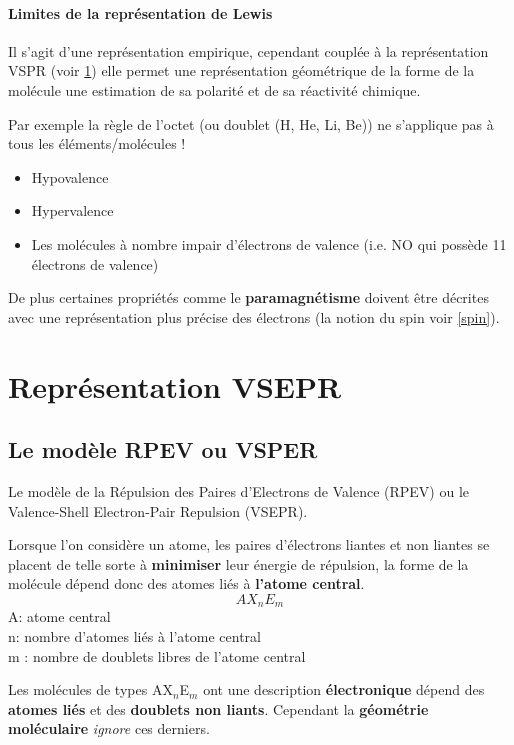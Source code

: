 \documentclass[10pt,a4paper]{book}
\begin{document}
\paragraph{Limites de la représentation de Lewis} Il s'agit d'une représentation empirique, cependant couplée à la représentation VSPR (voir \ref{VSPR}) elle permet une représentation géométrique de la forme de la molécule une estimation de sa polarité et de sa réactivité chimique. \par
Par exemple la règle de l'octet (ou doublet (H, He, Li, Be)) ne s'applique pas à tous les éléments/molécules !
\begin{itemize}
\item Hypovalence
\item Hypervalence
\item Les molécules à nombre impair d'électrons de valence (i.e. NO qui possède 11 électrons de valence)
\end{itemize}
De plus certaines propriétés comme le \textbf{paramagnétisme} doivent être décrites avec une représentation plus précise des électrons (la notion du spin voir \ref{spin}).

\section{Représentation VSEPR} \label{VSPR}

\subsection{Le modèle RPEV ou VSPER}

Le modèle de la Répulsion des Paires d'Electrons de Valence (RPEV) ou le Valence-Shell Electron-Pair Repulsion (VSEPR). \par
Lorsque l'on considère un atome, les paires d'électrons liantes et non liantes se placent de telle sorte à \textbf{minimiser} leur énergie de répulsion, la forme de la molécule dépend donc des atomes liés à \textbf{l'atome central}.
\begin{displaymath}
AX_nE_m
\end{displaymath}
A: atome central \\
n: nombre d'atomes liés à l'atome central \\
m : nombre de doublets libres de l'atome central \\ \par
Les molécules de types AX$_n$E$_m$ ont une description \textbf{électronique} dépend des \textbf{atomes liés} et des \textbf{doublets non liants}. Cependant la \textbf{géométrie moléculaire} \textit{ignore} ces derniers.
\end{document}
